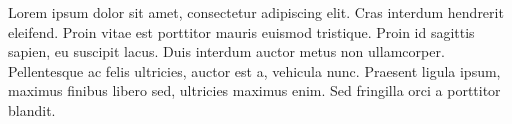 Lorem ipsum dolor sit amet, consectetur adipiscing elit. Cras interdum hendrerit eleifend. Proin vitae est porttitor mauris euismod tristique. Proin id sagittis sapien, eu suscipit lacus. Duis interdum auctor metus non ullamcorper. Pellentesque ac felis ultricies, auctor est a, vehicula nunc. Praesent ligula ipsum, maximus finibus libero sed, ultricies maximus enim. Sed fringilla orci a porttitor blandit.
